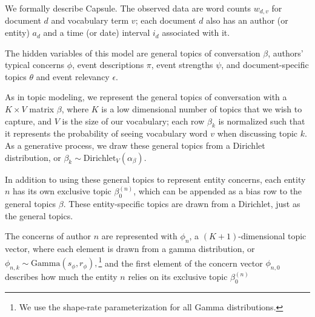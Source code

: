 We formally describe Capsule. The observed data are word counts $w_{d,v}$ for document $d$ and vocabulary term $v$; each document $d$ also has an author (or entity) $a_d$ and a time (or date) interval $i_d$ associated with it.

The hidden variables of this model are general topics of conversation $\beta$, authors' typical concerns $\phi$, event descriptions $\pi$, event strengths $\psi$, and document-specific topics $\theta$ and event relevancy $\epsilon$.  %


As in topic modeling, we represent the general topics of conversation with a $K\times V$ matrix $\beta$, where $K$ is a low dimensional number of topics that we wish to capture, and $V$ is the size of our vocabulary; each row $\beta_k$ is normalized such that it represents the probability of seeing vocabulary word $v$ when discussing topic $k$.  As a generative process, we draw these general topics from a Dirichlet distribution, or $\beta_k \sim \mbox{Dirichlet}_V (\alpha_\beta).$ 

In addition to using these general topics to represent entity concerns, each entity $n$ has its own exclusive topic $\beta^{(n)}_{0}$, which can be appended as a bias row to the general topics $\beta$.  These entity-specific topics are drawn from a Dirichlet, just as the general topics.

The concerns of author $n$ are represented with $\phi_n$, a $(K+1)$-dimensional topic vector, where each element is drawn from a gamma distribution, or $\phi_{n,k} \sim \mbox{Gamma}(s_\phi, r_\phi),$\footnote{We use the shape-rate parameterization for all Gamma distributions.} and the first element of the concern vector $\phi_{n,0}$ describes how much the entity $n$ relies on its exclusive topic $\beta^{(n)}_0$

